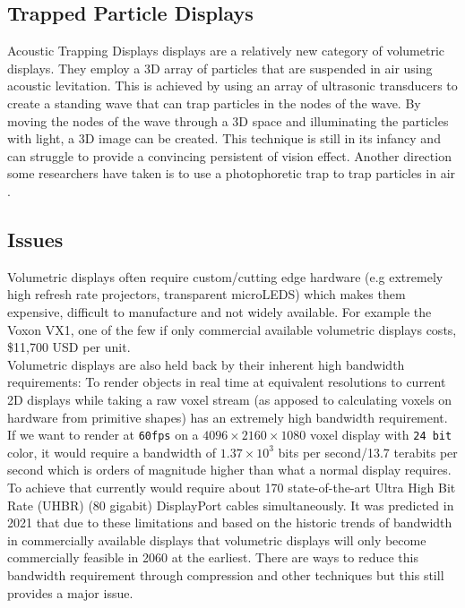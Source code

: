 \subsection{Trapped Particle Displays}
Acoustic Trapping Displays displays are a relatively new category of volumetric displays. They employ a 3D array of particles that are suspended in air using acoustic levitation. \cite{10.1063/1.5113467} \cite{Hirayama2019} This is achieved by using an array of ultrasonic transducers to create a standing wave that can trap particles in the nodes of the wave. By moving the nodes of the wave through a 3D space and illuminating the particles with light, a 3D image can be created. This technique is still in its infancy and can struggle to provide a convincing persistent of vision effect. Another direction some researchers have taken is to use a photophoretic trap to trap particles in air \cite{Smalley2018}.

\subsection{Issues}

Volumetric displays often require custom/cutting edge hardware (e.g extremely high refresh rate projectors,  transparent microLEDS) which makes them expensive, difficult to manufacture and not widely available. For example the Voxon VX1, one of the few if only commercial available volumetric displays costs, \$11,700 USD \cite{noauthor_products_nodate} per unit. \\

Volumetric displays are also held back by their inherent high bandwidth requirements: To render objects in real time at equivalent resolutions to current 2D displays while taking a raw voxel stream (as apposed to calculating voxels on hardware from primitive shapes) has an extremely high bandwidth requirement. If we want to render at \texttt{60fps} on a $4096 \times 2160 \times 1080$ voxel display with \texttt{24 bit} color, it would require a bandwidth of $1.37 \times 10^3$ bits per second/13.7 terabits per second which is orders of magnitude higher than what a normal display requires. To achieve that currently would require about 170 state-of-the-art Ultra High Bit Rate (UHBR) (80 gigabit) DisplayPort cables simultaneously. It was predicted in 2021 \cite{LAM2021050011} that due to these limitations and based on the historic trends of bandwidth in commercially available displays that volumetric displays will only become commercially feasible in 2060 at the earliest. There are ways to reduce this bandwidth requirement through compression and other techniques \cite{4487481} but this still provides a major issue. \\

